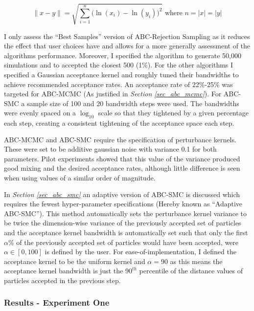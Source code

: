 \documentclass[11pt,a4paper]{article}
\theoremstyle{break}
\begin{document}
  \begin{equation}\label{eqn_log_euclidean_distance}
    \|x-y\|=\sqrt{\sum_{i=1}^n\big(\ln(x_i)-\ln(y_i)\big)^2}\text{ where }n=|x|=|y|
  \end{equation}

  \par I only assess the ``Best Samples'' version of ABC-Rejection Sampling as it reduces the effect that user choices have and allows for a more generally assessment of the algorithms performance. Moreover, I specified the algorithm to generate 50,000 simulations and to accepted the closest 500 (1\%). For the other algorithms I specified a Gaussian acceptance kernel and roughly tuned their bandwidths to achieve recommended acceptance rates. An acceptance rate of 22\%-25\% was targeted for ABC-MCMC (As justified in \textit{Section \ref{sec_abc_mcmc}}). For ABC-SMC a sample size of 100 and 20 bandwidth steps were used. The bandwidths were evenly spaced on a $\log_10$ scale so that they tightened by a given percentage each step, creating a consistent tightening of the acceptance space each step.

  \par ABC-MCMC and ABC-SMC require the specification of perturbance kernels. These were set to be additive gaussian noise with variance 0.1 for both parameters. Pilot experiments showed that this value of the variance produced good mixing and the desired acceptance rates, although little difference is seen when using values of a similar order of magnitude.

  \par In \textit{Section \ref{sec_abc_smc}} an adaptive version of ABC-SMC is discussed which requires the fewest hyper-parameter specifications (Hereby known as ``Adaptive ABC-SMC''). This method automatically sets the perturbance kernel variance to be twice the dimension-wise variance of the previously accepted set of particles and the acceptance kernel bandwidth is automatically set such that only the first $\alpha\%$ of the previously accepted set of particles would have been accepted, were $\alpha\in[0,100]$ is defined by the user. For ease-of-implementation, I defined the acceptance kernel to be the uniform kernel and $\alpha=90$ as this means the acceptance kernel bandwidth is just the $90^{th}$ percentile of the distance values of particles accepted in the previous step.

\subsubsection*{Results - Experiment One}
\end{document}

